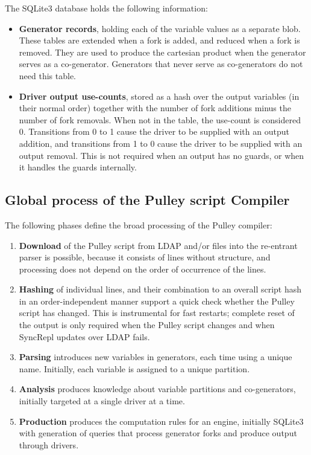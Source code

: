 \documentclass[a4paper]{article}
\begin{document}
The SQLite3 database holds the following information:

\begin{itemize}
\item\textbf{Generator records}, holding each of the variable values as a separate blob.  These tables are extended when a fork is added, and reduced when a fork is removed.  They are used to produce the cartesian product when the generator serves as a co-generator.  Generators that never serve as co-generators do not need this table.
\item\textbf{Driver output use-counts}, stored as a hash over the output variables (in their normal order) together with the number of fork additions minus the number of fork removals.  When not in the table, the use-count is considered 0.  Transitions from 0 to 1 cause the driver to be supplied with an output addition, and transitions from 1 to 0 cause the driver to be supplied with an output removal.  This is not required when an output has no guards, or when it handles the guards internally.
\end{itemize}

\subsection{Global process of the Pulley script Compiler}

The following phases define the broad processing of the Pulley compiler:

\begin{enumerate}
\item\textbf{Download} of the Pulley script from LDAP and/or files into the re-entrant parser is possible, because it consists of lines without structure, and processing does not depend on the order of occurrence of the lines.
\item\textbf{Hashing} of individual lines, and their combination to an overall script hash in an order-independent manner support a quick check whether the Pulley script has changed.  This is instrumental for fast restarts; complete reset of the output is only required when the Pulley script changes and when SyncRepl updates over LDAP fails.
\item\textbf{Parsing} introduces new variables in generators, each time using a unique name.  Initially, each variable is assigned to a unique partition.
\item\textbf{Analysis} produces knowledge about variable partitions and co-generators, initially targeted at a single driver at a time.
\item\textbf{Production} produces the computation rules for an engine, initially SQLite3 with generation of queries that process generator forks and produce output through drivers.
\end{enumerate}
\end{document}

